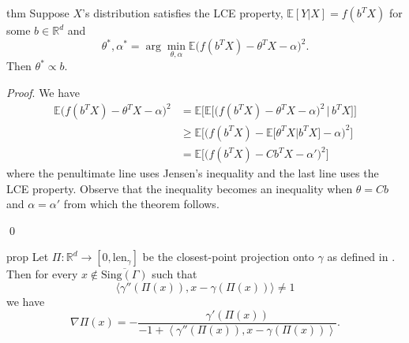 \documentclass[11pt]{article}
\begin{document}
\begin{restatable}{thm}{} \label{thm: lce proportionality}
    Suppose $X$'s distribution satisfies the LCE property, $\mathbb{E}[Y|X] = f(b^{T}X)$ for some $b \in \mathbb{R}^d$ and 
    \[\theta^*, \alpha^* = \arg\min_{\theta, \alpha}\mathbb{E}\big(f(b^{T}X) - \theta^{T}X - \alpha\big)^2.\]
    Then $\theta^* \propto b$. 
\end{restatable}
\noindent \textit{Proof}. We have 
\begin{align*}
    \mathbb{E}\big(f(b^{T}X) - \theta^{T}X-\alpha\big)^2 &= \mathbb{E}\Big[ \mathbb{E}\Big[\big(f(b^{T}X) - \theta^{T}X-\alpha\big)^2 \, \Big | \, b^{T}X\Big] \Big] \\
    &\geq \mathbb{E}\Big[ \Big(f(b^{T}X) - \mathbb{E}\big[\theta^{T}X |b^{T}X\big]-\alpha\Big)^2 \Big] \\
    &= \mathbb{E}\Big[ \Big(f(b^{T}X) - Cb^{T}X-\alpha'\Big)^2 \Big]
\end{align*}
where the penultimate line uses Jensen's inequality and the last line uses the LCE property. Observe that the inequality becomes an inequality when $\theta = Cb$ and $\alpha = \alpha'$ from which the theorem follows. 

\qed{}

\begin{restatable}{prop}{} \label{prop: proj gradient}
    Let $\Pi: \mathbb{R}^d \rightarrow [0, \text{len}_{\gamma}]$ be the closest-point projection onto $\gamma$ as defined in . Then for every $x \notin \overline{\text{Sing}(\Gamma)}$ such that 
    \[\langle\gamma''(\Pi(x)), x - \gamma(\Pi(x))\rangle \neq 1\]
    we have 
    \[\nabla\Pi(x)  = -\frac{\gamma'(\Pi(x))}{-1 + \left\langle\gamma''(\Pi(x)), x - \gamma(\Pi(x))\right\rangle}.\]
\end{restatable}
\end{document}
